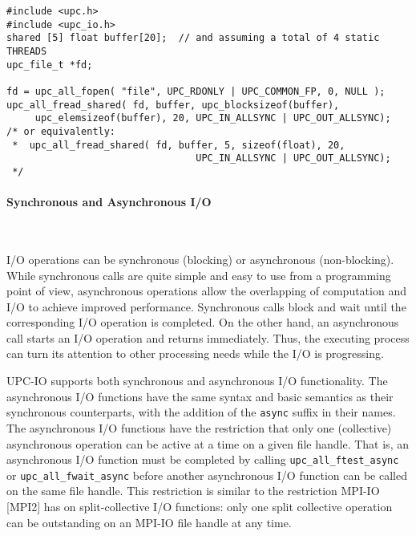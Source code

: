 \documentclass[12pt,titlepage]{article}
\newcounter{parnum}
\newcommand\np{\addtocounter{parnum}{1}\hspace{-2em}\makebox[2em][l]{\arabic{parnum}}}
\begin{document}
\begin{verbatim}
#include <upc.h>
#include <upc_io.h>
shared [5] float buffer[20];  // and assuming a total of 4 static THREADS
upc_file_t *fd; 

fd = upc_all_fopen( "file", UPC_RDONLY | UPC_COMMON_FP, 0, NULL );
upc_all_fread_shared( fd, buffer, upc_blocksizeof(buffer), 
     upc_elemsizeof(buffer), 20, UPC_IN_ALLSYNC | UPC_OUT_ALLSYNC);
/* or equivalently: 
 *  upc_all_fread_shared( fd, buffer, 5, sizeof(float), 20, 
                                 UPC_IN_ALLSYNC | UPC_OUT_ALLSYNC); 
 */
\end{verbatim}

\paragraph{Synchronous and Asynchronous I/O}\ \\

\np I/O operations can be synchronous (blocking) or asynchronous (non-blocking).
While synchronous calls are quite simple and easy to use from a programming
point of view, asynchronous operations allow the overlapping of computation
and I/O to achieve improved performance. Synchronous calls block and wait
until the corresponding I/O operation is completed. On the other hand, an
asynchronous call starts an I/O operation and returns immediately. Thus, the
executing process can turn its attention to other processing needs while the
I/O is progressing.

\np UPC-IO supports both synchronous and asynchronous I/O functionality. The
asynchronous I/O functions have the same syntax and basic semantics as their synchronous
counterparts, with the addition of the {\tt async} suffix in their names. The
asynchronous I/O functions have the restriction that only one (collective)
asynchronous operation can be active at a time on a given file handle. That
is, an asynchronous I/O function must be completed by calling
{\tt upc\_all\_ftest\_async} or {\tt upc\_all\_fwait\_async} before another asynchronous
I/O function can be called on the same file handle. This restriction is
similar to the restriction MPI-IO [MPI2] has on split-collective I/O functions:
only one split collective operation can be outstanding on an MPI-IO file
handle at any time.
\end{document}
